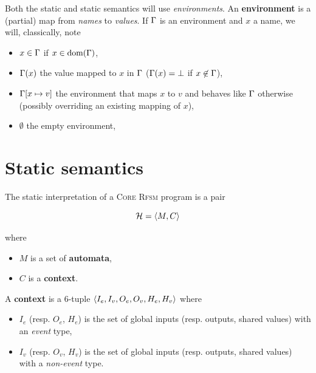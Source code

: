 Both the static and static semantics will use \emph{environments}. 
An \textbf{environment} is a (partial) map from \emph{names} to \emph{values}.
If $\Gamma$ is an environment and $x$ a name, we will, classically, note
\begin{itemize}
\item $x \in \Gamma$ if $x \in \text{dom}(\Gamma)$,
\item $\Gamma(x)$ the value mapped to $x$ in $\Gamma$ ($\Gamma(x)=\bot$ if $x \not\in \Gamma$), 
\item $\Gamma[x \mapsto v]$ the environment that maps $x$ to $v$ and behaves like $\Gamma$
otherwise (possibly overriding an existing mapping of $x$),
\item $\emptyset$ the empty environment,
\end{itemize}

\section{Static semantics}
\label{sec:static-semantics}

The static interpretation of a \textsc{Core Rfsm} program is a pair

\begin{equation*}
  \mathcal{H} = \langle M, C\rangle
\end{equation*}

where
\begin{itemize}
\item $M$ is a set of \textbf{automata},
\item $C$ is a \textbf{context}.
\end{itemize}

\medskip\step
A \textbf{context} is a 6-tuple $\langle I_e, I_v, O_e, O_v, H_e, H_v\rangle$ where
\begin{itemize}
\item $I_e$ (resp. $O_e$, $H_e$) is the set of global inputs (resp. outputs, shared values) with an \emph{event} type,
\item $I_v$ (resp. $O_v$, $H_v$) is the set of global inputs (resp. outputs, shared values) with a
  \emph{non-event} type.
\end{itemize}


